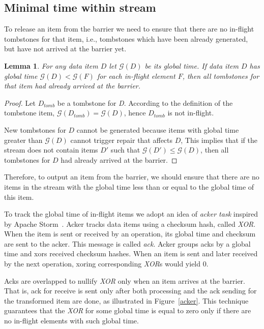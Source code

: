 \subsection{Minimal time within stream}

To release an item from the barrier we need to ensure that there are no in-flight tombstones for that item, i.e., tombstones which have been already generated, but have not arrived at the barrier yet.

\newtheorem{minimal-time-claim}{Lemma}

\begin{minimal-time-claim}
For any data item $D$ let $\mathcal{G} (D)$ be its global time. 
  If data item $D$ has global time $\mathcal{G} (D) < \mathcal{G} (F)$ for each in-flight element $F$, 
  then all tombstones for that item had already arrived at the barrier.
\end{minimal-time-claim}

\begin{proof}
  Let $D_{tomb}$ be a tombstone for {\it D}. 
  According to the definition of the tombstone item, $\mathcal{G} (D_{tomb}) = \mathcal{G} (D)$, hence $D_{tomb}$ is not in-flight.
  
  New tombstones for $D$ cannot be generated because items with global time greater than $\mathcal{G} (D)$ cannot trigger repair that affects $D$,
  This implies that if the stream does not contain items $D\prime$ such that $\mathcal{G} (D\prime) \le \mathcal{G} (D)$, then all tombstones for $D$ had already arrived at the barrier. 
\end{proof}

Therefore, to output an item from the barrier, we should ensure that there are no items in the stream with the global time less than or equal to the global time of this item.

To track the global time of in-flight items we adopt an idea of {\it acker task} inspired by Apache Storm~\cite{apache:storm}. Acker tracks data items using a checksum hash, called {\it XOR}. When the item is sent or received by an operation, its global time and checksum are sent to the acker. This message is called {\it ack}.
 Acker groups acks by a global time and xors received checksum hashes. 
When an item is sent and later received by the next operation, xoring corresponding {\it XOR}s would yield 0.

Acks are overlapped to nullify {\it XOR} only when an item arrives at the barrier. That is, ack for receive is sent only after both processing and the ack sending for the transformed item are done, as illustrated in Figure~\ref{acker}. This technique guarantees that the {\it XOR} for some global time is equal to zero only if there are no in-flight elements with such global time.

